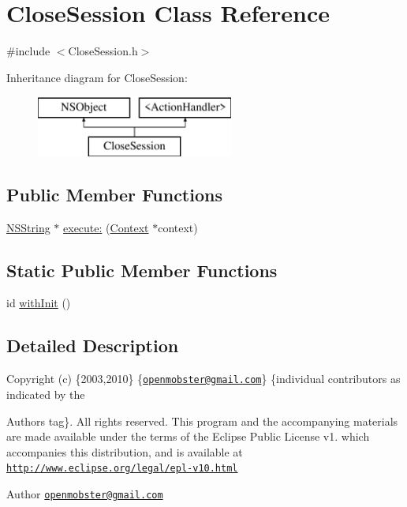 \hypertarget{interface_close_session}{
\section{\-Close\-Session \-Class \-Reference}
\label{interface_close_session}
}


{\ttfamily \#include $<$\-Close\-Session.\-h$>$}

\-Inheritance diagram for \-Close\-Session\-:\begin{figure}[H]
\begin{center}
\leavevmode
\includegraphics[height=2.000000cm]{interface_close_session}
\end{center}
\end{figure}
\subsection*{\-Public \-Member \-Functions}
\begin{DoxyCompactItemize}
\item 
\hyperlink{class_n_s_string}{\-N\-S\-String} $\ast$ \hyperlink{interface_close_session_ac6c40d103f3887dcab388c34951937f7}{execute\-:} (\hyperlink{interface_context}{\-Context} $\ast$context)
\end{DoxyCompactItemize}
\subsection*{\-Static \-Public \-Member \-Functions}
\begin{DoxyCompactItemize}
\item 
id \hyperlink{interface_close_session_a1201adc12995c1c02e3ceac7d88c5bc2}{with\-Init} ()
\end{DoxyCompactItemize}


\subsection{\-Detailed \-Description}
\-Copyright (c) \{2003,2010\} \{\href{mailto:openmobster@gmail.com}{\tt openmobster@gmail.\-com}\} \{individual contributors as indicated by the \begin{DoxyAuthor}{\-Authors}
tag\}. \-All rights reserved. \-This program and the accompanying materials are made available under the terms of the \-Eclipse \-Public \-License v1. which accompanies this distribution, and is available at \href{http://www.eclipse.org/legal/epl-v10.html}{\tt http\-://www.\-eclipse.\-org/legal/epl-\/v10.\-html}
\end{DoxyAuthor}
\begin{DoxyAuthor}{\-Author}
\href{mailto:openmobster@gmail.com}{\tt openmobster@gmail.\-com} 
\end{DoxyAuthor}


